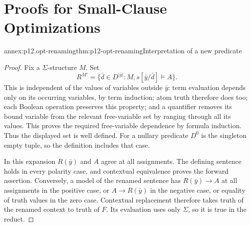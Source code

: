 \chapter{Proofs for Small-Clause Optimizations}
\label{annex:p12-opt-small-clauses}

\begin{annexitem}{annex:p12.opt-renaming}{thm:p12-opt-renaming}{Interpretation of a new predicate}
\begin{proof}
Fix a \(\Sigma\)-structure \(M\). Set
\[
 R^{M'}=\{\bar d\in D^{|\bar y|}:M,s[\bar y/\bar d]\models A\}.
\]
This is independent of the values of variables outside \(\bar y\):
term evaluation depends only on its occurring variables, by term
induction; atom truth therefore does too; each Boolean operation
preserves this property; and a quantifier removes its bound variable
from the relevant free-variable set by ranging through all its
values. This proves the required free-variable dependence by
formula induction. Thus the displayed set is well defined.
For a nullary predicate \(D^0\) is the singleton empty tuple,
so the definition includes that case.

In this expansion \(R(\bar y)\) and \(A\) agree at all assignments.
The defining sentence holds in every polarity case, and contextual
equivalence proves the forward assertion.
Conversely, a model of the renamed sentence has
\(R(\bar y)\to A\) at all assignments in the positive case, or
\(A\to R(\bar y)\) in the negative case, or equality of truth
values in the zero case. Contextual replacement therefore takes
truth of the renamed context to truth of \(F\). Its evaluation
uses only \(\Sigma\), so it is true in the reduct.
\end{proof}
\end{annexitem}

